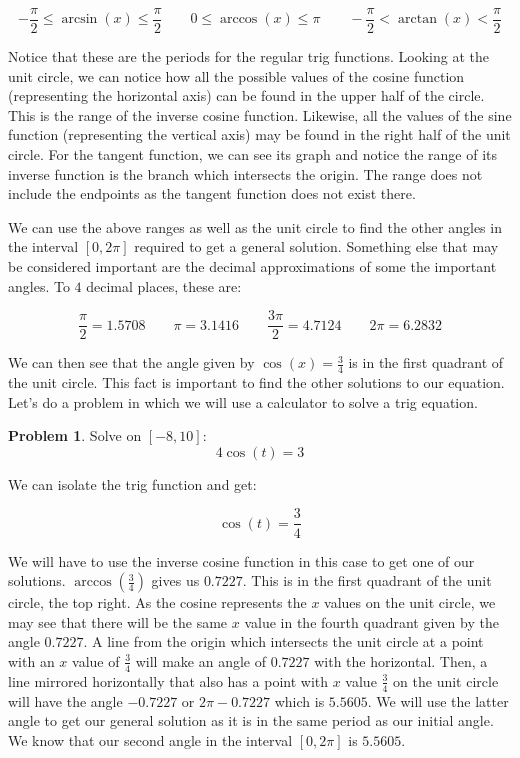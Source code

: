 \documentclass[12pt]{article}
\theoremstyle{definition}
\newtheorem{problem}{Problem}
\begin{document}
\begin{equation}
    -\frac{\pi}{2} \leq \arcsin(x) \leq \frac{\pi}{2} \qquad 0 \leq \arccos(x) \leq \pi \qquad -\frac{\pi}{2} < \arctan(x) < \frac{\pi}{2}
\end{equation}

Notice that these are the periods for the regular trig functions.
Looking at the unit circle, we can notice how all the possible values of the cosine function (representing the horizontal axis) can be found in the upper half of the circle.
This is the range of the inverse cosine function.
Likewise, all the values of the sine function (representing the vertical axis) may be found in the right half of the unit circle.
For the tangent function, we can see its graph and notice the range of its inverse function is the branch which intersects the origin.
The range does not include the endpoints as the tangent function does not exist there.

We can use the above ranges as well as the unit circle to find the other angles in the interval $[0, 2\pi]$ required to get a general solution.
Something else that may be considered important are the decimal approximations of some the important angles.
To $4$ decimal places, these are:

\begin{equation}
    \frac{\pi}{2} = 1.5708 \qquad \pi = 3.1416 \qquad \frac{3\pi}{2} = 4.7124 \qquad 2\pi = 6.2832
\end{equation}

We can then see that the angle given by $\cos(x) = \frac{3}{4}$ is in the first quadrant of the unit circle.
This fact is important to find the other solutions to our equation.
Let's do a problem in which we will use a calculator to solve a trig equation.

\begin{problem}
Solve on $[-8, 10]$:
\begin{equation*}
    4\cos(t) = 3 \label{eq:6}
\end{equation*}
\end{problem}

We can isolate the trig function and get:

\begin{equation}
    \cos(t) = \frac{3}{4}
\end{equation}

We will have to use the inverse cosine function in this case to get one of our solutions.
$\arccos\left(\frac{3}{4}\right)$ gives us $0.7227$.
This is in the first quadrant of the unit circle, the top right.
As the cosine represents the $x$ values on the unit circle, we may see that there will be the same $x$ value in the fourth quadrant given by the angle $0.7227$.
A line from the origin which intersects the unit circle at a point with an $x$ value of $\frac{3}{4}$ will make an angle of $0.7227$ with the horizontal.
Then, a line mirrored horizontally that also has a point with $x$ value $\frac{3}{4}$ on the unit circle will have the angle $-0.7227$ or $2\pi-0.7227$ which is $5.5605$.
We will use the latter angle to get our general solution as it is in the same period as our initial angle.
We know that our second angle in the interval $[0, 2\pi]$ is $5.5605$.
\end{document}
